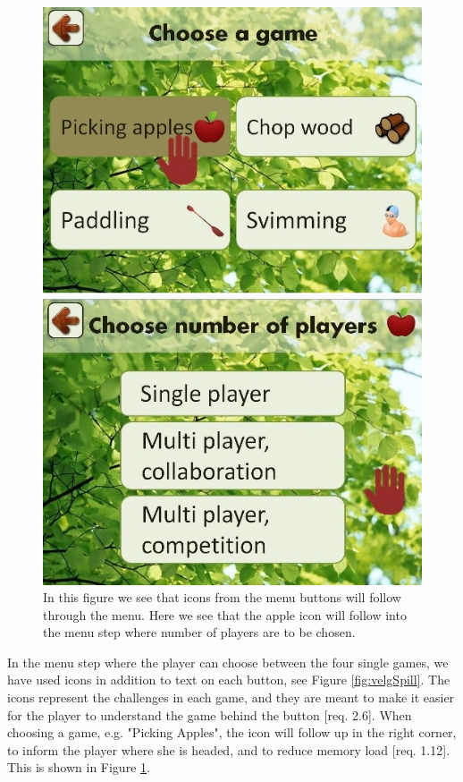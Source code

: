 \begin{figure} [H]
\centering
\includegraphics[scale=0.4]{menuIconApple.jpg}
\caption[Menu - use of icons]{In this figure we see that icons from the menu buttons will follow through the menu. Here we see that the apple icon will follow into the menu step where number of players are to be chosen.}
\label{fig:iconEple}
\end{figure} 

In the menu step where the player can choose between the four single games, we have used icons in addition to text on each button, see Figure \ref{fig:velgSpill}. The icons represent the challenges in each game, and they are meant to make it easier for the player to understand the game behind the button [req. 2.6]. When choosing a game, e.g. "Picking Apples", the icon will follow up in the right corner, to inform the player where she is headed, and to reduce memory load [req. 1.12]. This is shown in Figure \ref{fig:iconEple}.  

